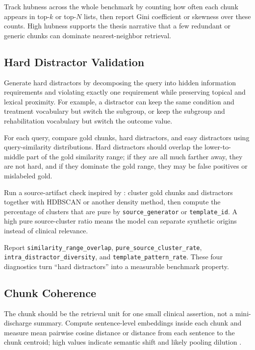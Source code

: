\documentclass[11pt,a4paper]{article}
\newcommand{\field}[1]{\texttt{#1}}
\begin{document}
Track hubness across the whole benchmark by counting how often each chunk appears in top-$k$ or top-$N$ lists, then report Gini coefficient or skewness over these counts. High hubness supports the thesis narrative that a few redundant or generic chunks can dominate nearest-neighbor retrieval.

\subsection{Hard Distractor Validation}

Generate hard distractors by decomposing the query into hidden information requirements and violating exactly one requirement while preserving topical and lexical proximity. For example, a distractor can keep the same condition and treatment vocabulary but switch the subgroup, or keep the subgroup and rehabilitation vocabulary but switch the outcome value.

For each query, compare gold chunks, hard distractors, and easy distractors using query-similarity distributions. Hard distractors should overlap the lower-to-middle part of the gold similarity range; if they are all much farther away, they are not hard, and if they dominate the gold range, they may be false positives or mislabeled gold.

Run a source-artifact check inspired by \citet{zhangWhenHardNegatives2026}: cluster gold chunks and distractors together with HDBSCAN or another density method, then compute the percentage of clusters that are pure by \field{source\_generator} or \field{template\_id}. A high pure source-cluster ratio means the model can separate synthetic origins instead of clinical relevance.

Report \field{similarity\_range\_overlap}, \field{pure\_source\_cluster\_rate}, \field{intra\_distractor\_diversity}, and \field{template\_pattern\_rate}. These four diagnostics turn ``hard distractors'' into a measurable benchmark property.

\subsection{Chunk Coherence}

The chunk should be the retrieval unit for one small clinical assertion, not a mini-discharge summary. Compute sentence-level embeddings inside each chunk and measure mean pairwise cosine distance or distance from each sentence to the chunk centroid; high values indicate semantic shift and likely pooling dilution \citep{gaoPoolingSemanticShift2026}.
\end{document}
